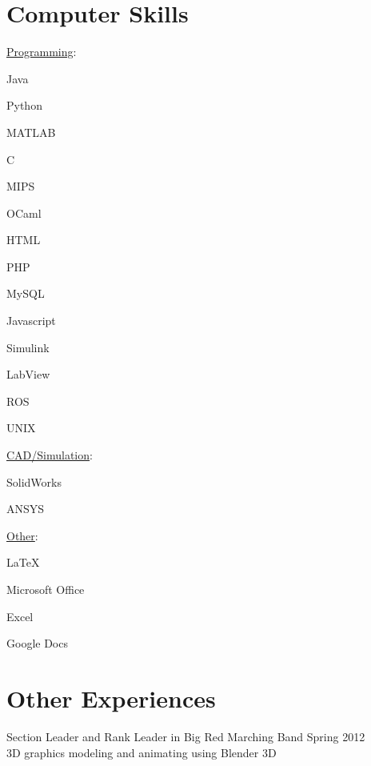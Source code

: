 \documentclass{BradyResume}
\begin{document}
\section*{Computer Skills}
\uline{Programming}:%
\begin{pipelist}
    \item Java
    \item Python
    \item MATLAB
    \item C
    \item MIPS
    \item OCaml
    \item HTML
    \item PHP
    \item MySQL
    \item Javascript
    \item Simulink 
    \item LabView
    \item ROS
    \item UNIX
\end{pipelist}
%
\uline{CAD/Simulation}:%
\begin{pipelist}
    \item SolidWorks
    \item ANSYS
\end{pipelist}
%
\uline{Other}:%
\begin{pipelist}
    \item \LaTeX
    \item Microsoft Office
    \item Excel
    \item Google Docs
\end{pipelist}

\section*{Other Experiences}
Section Leader and Rank Leader in Big Red Marching Band \dotfill Spring 2012\\
3D graphics modeling and animating using Blender 3D
\end{document}
